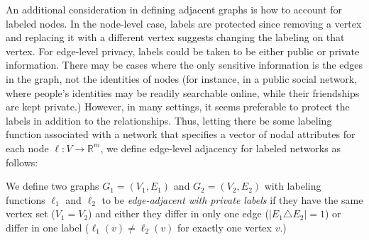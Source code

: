 An additional consideration in defining adjacent graphs is how to account for labeled nodes. In the node-level case, labels are protected since removing a vertex and replacing it with a different vertex suggests changing the labeling on that vertex. For edge-level privacy, labels could be taken to be either public or private information.  There may be cases where the only sensitive information is the edges in the graph, not the identities of nodes (for instance, in a public social network, where people's identities may be readily searchable online, while their friendships are kept private.) However, in many settings, it seems preferable to protect the labels in addition to the relationships. Thus, letting there be some labeling function associated with a network that specifies a vector of nodal attributes for each node $\ell: V \to \mathbb{R}^m$, we define edge-level adjacency for labeled networks as follows:

\begin{definition}
	\label{def:edge_level}
	We define two graphs $G_1 = (V_1, E_1)$ and $G_2 = (V_2, E_2)$ with labeling functions $\ell_1$ and $\ell_2$ to be \emph{edge-adjacent with private labels} if they have the same vertex set ($V_1 = V_2$) and either they  differ in only one edge ($\left| E_1 \triangle E_2   \right| = 1$) or differ in one label ($\ell_1(v) \not = \ell_2(v)$ for exactly one vertex $v$.)
\end{definition}


